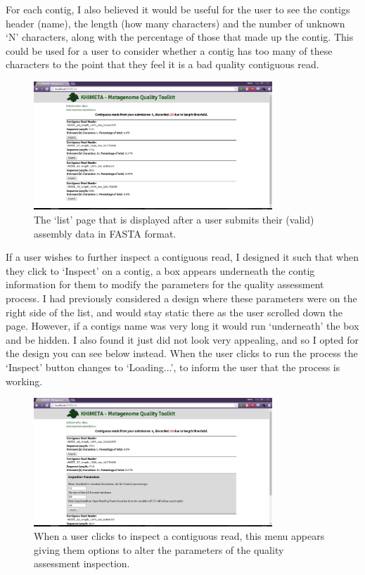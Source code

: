 For each contig, I also believed it would be useful for the user to see the contigs header (name), the length (how many characters) and the number of unknown `N' characters, along with the percentage of those that made up the contig. This could be used for a user to consider whether a contig has too many of these characters to the point that they feel it is a bad quality contiguous read.
\begin{figure}[H]
	\centering
\includegraphics[width=0.8\textwidth]{images/ui2}
\caption{The `list' page that is displayed after a user submits their (valid) assembly data in FASTA format.}
\end{figure}

If a user wishes to further inspect a contiguous read, I designed it such that when they click to `Inspect' on a contig, a box appears underneath the contig information for them to modify the parameters for the quality assessment process. I had previously considered a design where these parameters were on the right side of the list, and would stay static there as the user scrolled down the page. However, if a contigs name was very long it would run `underneath' the box and be hidden. I also found it just did not look very appealing, and so I opted for the design you can see below instead. When the user clicks to run the process the `Inspect' button changes to `Loading...', to inform the user that the process is working.

\begin{figure}[H]
	\centering
\includegraphics[width=0.8\textwidth]{images/ui3}
\caption{When a user clicks to inspect a contiguous read, this menu appears giving them options to alter the parameters of the quality assessment inspection.}
\end{figure}

